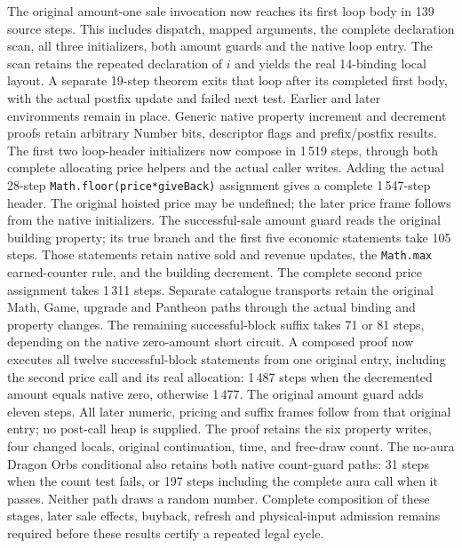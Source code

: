 \documentclass[11pt,a4paper]{article}
\numberwithin{equation}{section}
\theoremstyle{definition}
\theoremstyle{remark}
\begin{document}
The original amount-one sale invocation now reaches its first loop body in 139 source steps. This includes dispatch, mapped arguments, the complete declaration scan, all three initializers, both amount guards and the native loop entry. The scan retains the repeated declaration of $i$ and yields the real 14-binding local layout. A separate 19-step theorem exits that loop after its completed first body, with the actual postfix update and failed next test. Earlier and later environments remain in place. Generic native property increment and decrement proofs retain arbitrary Number bits, descriptor flags and prefix/postfix results. The first two loop-header initializers now compose in 1\,519 steps, through both complete allocating price helpers and the actual caller writes. Adding the actual 28-step \texttt{Math.floor(price*giveBack)} assignment gives a complete 1\,547-step header. The original hoisted price may be undefined; the later price frame follows from the native initializers. The successful-sale amount guard reads the original building property; its true branch and the first five economic statements take 105 steps. Those statements retain native sold and revenue updates, the \texttt{Math.max} earned-counter rule, and the building decrement. The complete second price assignment takes 1\,311 steps. Separate catalogue transports retain the original Math, Game, upgrade and Pantheon paths through the actual binding and property changes. The remaining successful-block suffix takes 71 or 81 steps, depending on the native zero-amount short circuit. A composed proof now executes all twelve successful-block statements from one original entry, including the second price call and its real allocation: 1\,487 steps when the decremented amount equals native zero, otherwise 1\,477. The original amount guard adds eleven steps. All later numeric, pricing and suffix frames follow from that original entry; no post-call heap is supplied. The proof retains the six property writes, four changed locals, original continuation, time, and free-draw count. The no-aura Dragon Orbs conditional also retains both native count-guard paths: 31 steps when the count test fails, or 197 steps including the complete aura call when it passes. Neither path draws a random number. Complete composition of these stages, later sale effects, buyback, refresh and physical-input admission remains required before these results certify a repeated legal cycle.
\end{document}
